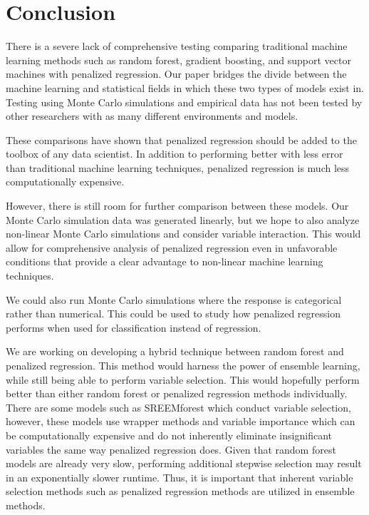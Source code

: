\documentclass{article}
\begin{document}
\section{Conclusion}\label{sec:conclusion}

There is a severe lack of comprehensive testing comparing traditional machine learning methods such as random forest, gradient boosting, and support vector machines with penalized regression. Our paper bridges the divide between the machine learning and statistical fields in which these two types of models exist in. Testing using Monte Carlo simulations and empirical data has not been tested by other researchers with as many different environments and models.

These comparisons have shown that penalized regression should be added to the toolbox of any data scientist. In addition to performing better with less error than traditional machine learning techniques, penalized regression is much less computationally expensive.

However, there is still room for further comparison between these models. Our Monte Carlo simulation data was generated linearly, but we hope to also analyze non-linear Monte Carlo simulations and consider variable interaction. This would allow for comprehensive analysis of penalized regression even in unfavorable conditions that provide a clear advantage to non-linear machine learning techniques.

We could also run Monte Carlo simulations where the response is categorical rather than numerical. This could be used to study how penalized regression performs when used for classification instead of regression.

We are working on developing a hybrid technique between random forest and penalized regression. This method would harness the power of ensemble learning, while still being able to perform variable selection. This would hopefully perform better than either random forest or penalized regression methods individually. There are some models such as SREEMforest \cite{capitaine2021random} which conduct variable selection, however, these models use wrapper methods and variable importance which can be computationally expensive and do not inherently eliminate insignificant variables the same way penalized regression does. Given that random forest models are already very slow, performing additional stepwise selection may result in an exponentially slower runtime. Thus, it is important that inherent variable selection methods such as penalized regression methods are utilized in ensemble methods.
\end{document}

